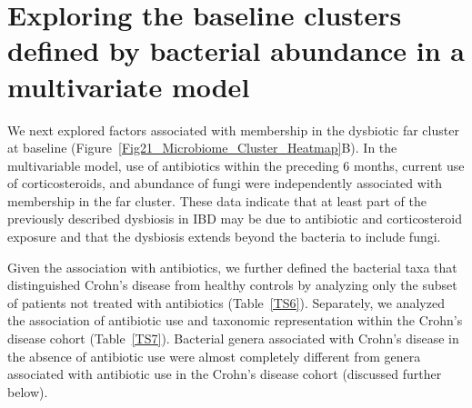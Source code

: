 	
\section{Exploring the baseline clusters defined by bacterial abundance in a multivariate model }
We next explored factors associated with membership in the dysbiotic far cluster at baseline (Figure~\ref{Fig21_Microbiome_Cluster_Heatmap}B). In the multivariable model, use of antibiotics within the preceding 6 months, current use of corticosteroids, and abundance of fungi were independently associated with membership in the far cluster. These data indicate that at least part of the previously described dysbiosis in IBD may be due to antibiotic and corticosteroid exposure and that the dysbiosis extends beyond the bacteria to include fungi. 

Given the association with antibiotics, we further defined the bacterial taxa that distinguished Crohn's disease from healthy controls by analyzing only the subset of patients not treated with antibiotics (Table~\ref{TS6}). Separately, we analyzed the association of antibiotic use and taxonomic representation within the Crohn's disease cohort (Table~\ref{TS7}). Bacterial genera associated with Crohn's disease in the absence of antibiotic use were almost completely different from genera associated with antibiotic use in the Crohn's disease cohort (discussed further below). 


